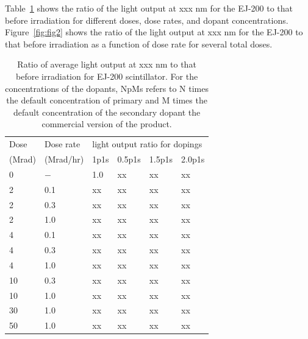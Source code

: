 \documentclass[review]{elsarticle}
\begin{document}


Table~\ref{tab:ResultsEJ200} shows the ratio of the light output
at {\color{red} xxx nm}
for the EJ-200  to that before irradiation for different doses, dose rates, and dopant concentrations.
Figure~\ref{fig:fig2} shows the ratio of the light output
at {\color{red} xxx nm}
for the EJ-200 to that before irradiation as a function of dose rate
for several total doses.

\begin{table}[thb]
\centering
\caption{
Ratio of average light output at {\color{red} xxx nm} to that before irradiation
for EJ-200 scintillator.  For the concentrations
of the dopants, NpMs refers to N times the default concentration of primary and M times the default concentration of the secondary dopant
the commercial version of the product.
}
\label{tab:ResultsEJ200}
{\small
\begin{tabular}{|l| l| l| l| l| l|}
\hline
Dose & Dose rate  &\multicolumn{4}{|l|}{light output ratio for dopings} \\
(Mrad)  & (Mrad/hr) & 1p1s & 0.5p1s & 1.5p1s & 2.0p1s   \\
\hline
\hline
0 & $-$ & 1.0 & {\color{red} xx} & {\color{red} xx} & {\color{red} xx}\\ \hline
2 & 0.1 & {\color{red} xx} & {\color{red} xx} & {\color{red} xx} & {\color{red} xx}\\
2 & 0.3 & {\color{red} xx} & {\color{red} xx} & {\color{red} xx} & {\color{red} xx}\\
2 & 1.0 & {\color{red} xx} & {\color{red} xx} & {\color{red} xx} & {\color{red} xx}\\ \hline
4 & 0.1 & {\color{red} xx} & {\color{red} xx} & {\color{red} xx} & {\color{red} xx}\\
4 & 0.3 & {\color{red} xx} & {\color{red} xx} & {\color{red} xx} & {\color{red} xx}\\
4 & 1.0 & {\color{red} xx} & {\color{red} xx} & {\color{red} xx} & {\color{red} xx}\\ \hline
10 & 0.3 & {\color{red} xx} & {\color{red} xx} & {\color{red} xx} & {\color{red} xx}\\
10 & 1.0 & {\color{red} xx} & {\color{red} xx} & {\color{red} xx} & {\color{red} xx}\\ \hline
30 & 1.0 & {\color{red} xx} & {\color{red} xx} & {\color{red} xx} & {\color{red} xx}\\ \hline
50 & 1.0 & {\color{red} xx} & {\color{red} xx} & {\color{red} xx} & {\color{red} xx}\\ \hline
\hline
\end{tabular}
}
\end{table}
\end{document}
